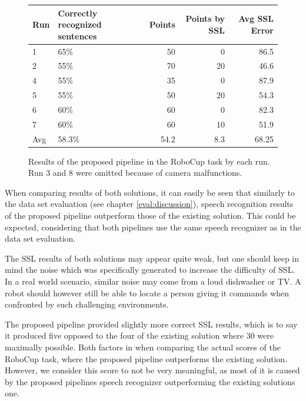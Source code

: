 \begin{figure}[ht]
	\begin{tabular}{ | l | p{3.5cm} | r | r | r |}
		\hline
		Run & Correctly recognized sentences & Points & Points by SSL & Avg SSL Error \\ \hline
		1 & 65\% & 50 &  0 & 86.5\\ \hline
		2 & 55\% & 70 & 20 & 46.6\\ \hline
		4 & 55\% & 35 &  0 & 87.9\\ \hline
		5 & 55\% & 50 & 20 & 54.3\\ \hline
		6 & 60\% & 60 &  0 & 82.3\\ \hline
		7 & 60\% & 60 & 10 & 51.9\\ \hhline{|=|=|=|=|=|}
		Avg & 58.3\% & 54.2 & 8.3 & 68.25\\
		\hline
	\end{tabular}
	\caption{Results of the proposed pipeline in the RoboCup task by each run.
		Run 3 and 8 were omitted because of camera malfunctions.}
	\label{table:eval_task_results_new}
\end{figure}

When comparing results of both solutions, it can easily be seen that similarly to the data set evaluation (see chapter \ref{eval:discussion}), speech recognition results of the proposed pipeline outperform those of the existing solution.
This could be expected, considering that both pipelines use the same speech recognizer as in the data set evaluation.

The SSL results of both solutions may appear quite weak, but one should keep in mind the noise which was specifically generated to increase the difficulty of SSL.
In a real world scenario, similar noise may come from a loud dishwasher or TV.
A robot should however still be able to locate a person giving it commands when confronted by such challenging environments.

The proposed pipeline provided slightly more correct SSL results, which is to say it produced five opposed to the four of the existing solution where 30 were maximally possible.
Both factors in when comparing the actual scores of the RoboCup task, where the proposed pipeline outperforms the existing solution.
However, we consider this score to not be very meaningful, as most of it is caused by the proposed pipelines speech recognizer outperforming the existing solutions one.

